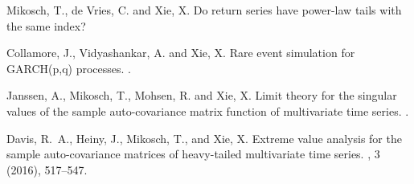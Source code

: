 \begin{enumerate}



{\sc Mikosch, T., de Vries, C. and Xie, X.}
\newblock Do return series have power-law tails with the same index?

{\sc Collamore, J., Vidyashankar, A. and Xie, X.}
\newblock Rare event simulation for GARCH(p,q) processes.
.

{\sc Janssen, A., Mikosch, T., Mohsen, R. and Xie, X.}
\newblock Limit theory for the singular values of the sample auto-covariance
  matrix function of multivariate time series.
.

{\sc Davis, R.~A., Heiny, J., Mikosch, T., and Xie, X.}
\newblock Extreme value analysis for the sample auto-covariance matrices of
  heavy-tailed multivariate time series.
, 3 (2016), 517--547. \href{http://link.springer.com/article/10.1007/s10687-016-0251-7}{\blue{[pdf]}}
\end{enumerate}


\newpage
\vspace*{\fill}
\newpage

